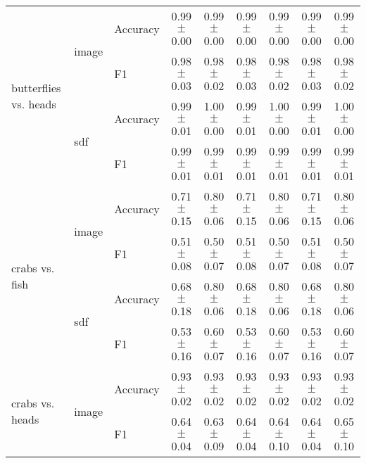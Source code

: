 \documentclass[anon,11pt]{9520} %
\begin{document}
\begin{table}
\begin{center}
\begin{tabular}{l|l|l|cc|cc|cc|}
\multirow{4}{*}{butterflies vs. heads}
& \multirow{2}{*}{image} & \multirow{1}{*}{Accuracy}& 0.99$\pm$0.00& 0.99$\pm$0.00& 0.99$\pm$0.00& 0.99$\pm$0.00& 0.99$\pm$0.00& 0.99$\pm$0.00\\ 
& & \multirow{1}{*}{F1}& 0.98$\pm$0.03& 0.98$\pm$0.02& 0.98$\pm$0.03& 0.98$\pm$0.02& 0.98$\pm$0.03& 0.98$\pm$0.02\\ \cline{2-9} 

& \multirow{2}{*}{sdf} & \multirow{1}{*}{Accuracy}& 0.99$\pm$0.01& 1.00$\pm$0.00& 0.99$\pm$0.01& 1.00$\pm$0.00& 0.99$\pm$0.01& 1.00$\pm$0.00\\ 
& & \multirow{1}{*}{F1}& 0.99$\pm$0.01& 0.99$\pm$0.01& 0.99$\pm$0.01& 0.99$\pm$0.01& 0.99$\pm$0.01& 0.99$\pm$0.01\\ \cline{2-9} 

\multirow{4}{*}{crabs vs. fish}
& \multirow{2}{*}{image} & \multirow{1}{*}{Accuracy}& 0.71$\pm$0.15& 0.80$\pm$0.06& 0.71$\pm$0.15& 0.80$\pm$0.06& 0.71$\pm$0.15& 0.80$\pm$0.06\\ 
& & \multirow{1}{*}{F1}& 0.51$\pm$0.08& 0.50$\pm$0.07& 0.51$\pm$0.08& 0.50$\pm$0.07& 0.51$\pm$0.08& 0.50$\pm$0.07\\ \cline{2-9} 

& \multirow{2}{*}{sdf} & \multirow{1}{*}{Accuracy}& 0.68$\pm$0.18& 0.80$\pm$0.06& 0.68$\pm$0.18& 0.80$\pm$0.06& 0.68$\pm$0.18& 0.80$\pm$0.06\\ 
& & \multirow{1}{*}{F1}& 0.53$\pm$0.16& 0.60$\pm$0.07& 0.53$\pm$0.16& 0.60$\pm$0.07& 0.53$\pm$0.16& 0.60$\pm$0.07\\ \cline{2-9} 

\multirow{4}{*}{crabs vs. heads}
& \multirow{2}{*}{image} & \multirow{1}{*}{Accuracy}& 0.93$\pm$0.02& 0.93$\pm$0.02& 0.93$\pm$0.02& 0.93$\pm$0.02& 0.93$\pm$0.02& 0.93$\pm$0.02\\ 
& & \multirow{1}{*}{F1}& 0.64$\pm$0.04& 0.63$\pm$0.09& 0.64$\pm$0.04& 0.64$\pm$0.10& 0.64$\pm$0.04& 0.65$\pm$0.10\\ \cline{2-9} 


\end{tabular}
\end{center}
\end{table}
\end{document}

